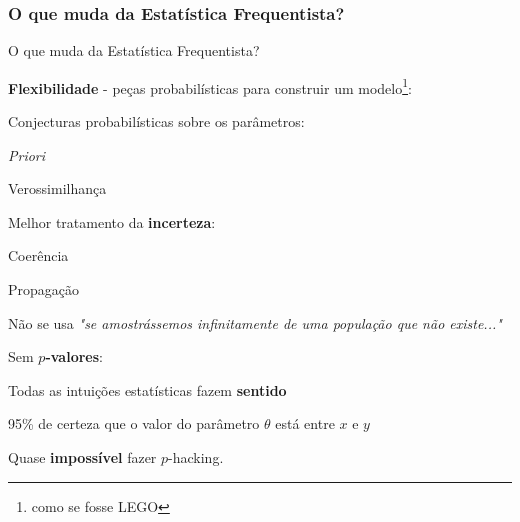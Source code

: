 \subsubsection{O que muda da Estatística Frequentista?}
\begin{frame}{O que muda da Estatística Frequentista?}
    \begin{vfilleditems}
        \item \textbf{Flexibilidade} - peças probabilísticas para construir um modelo\footnote{como se fosse LEGO}:
            \begin{vfilleditems}
                \item Conjecturas probabilísticas sobre os parâmetros:
                \begin{vfilleditems}
                    \item \textit{Priori}
                    \item Verossimilhança
                \end{vfilleditems}
            \end{vfilleditems}
        \item Melhor tratamento da \textbf{incerteza}:
        \begin{vfilleditems}
            \item Coerência
            \item Propagação
            \item Não se usa \textit{"se amostrássemos infinitamente de uma população que não existe..."}
        \end{vfilleditems}
        \item Sem \textbf{$p$-valores}:
        \begin{vfilleditems}
            \item Todas as intuições estatísticas fazem \textbf{sentido}
            \item 95\% de certeza que o valor do parâmetro $\theta$ está entre $x$ e $y$
            \item Quase \textbf{impossível} fazer $p$-hacking.
        \end{vfilleditems}
\end{vfilleditems}
\end{frame}

